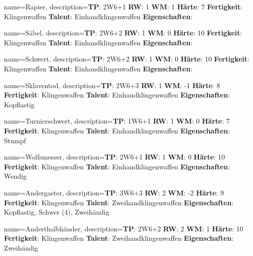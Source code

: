 {
    name={Rapier},
    description={\textbf{TP}: 2W6+1 \textbf{RW}: 1 \textbf{WM}: 1 \textbf{Härte}: 7        \textbf{Fertigkeit}: Klingenwaffen \textbf{Talent}: Einhandklingenwaffen \textbf{{Eigenschaften}}: }
}



{
    name={Säbel},
    description={\textbf{TP}: 2W6+2 \textbf{RW}: 1 \textbf{WM}: 0 \textbf{Härte}: 10        \textbf{Fertigkeit}: Klingenwaffen \textbf{Talent}: Einhandklingenwaffen \textbf{{Eigenschaften}}: }
}



{
    name={Schwert},
    description={\textbf{TP}: 2W6+2 \textbf{RW}: 1 \textbf{WM}: 0 \textbf{Härte}: 10        \textbf{Fertigkeit}: Klingenwaffen \textbf{Talent}: Einhandklingenwaffen \textbf{{Eigenschaften}}: }
}



{
    name={Sklaventod},
    description={\textbf{TP}: 2W6+3 \textbf{RW}: 1 \textbf{WM}: -1 \textbf{Härte}: 8        \textbf{Fertigkeit}: Klingenwaffen \textbf{Talent}: Einhandklingenwaffen \textbf{{Eigenschaften}}: Kopflastig}
}



{
    name={Turnierschwert},
    description={\textbf{TP}: 1W6+1 \textbf{RW}: 1 \textbf{WM}: 0 \textbf{Härte}: 7        \textbf{Fertigkeit}: Klingenwaffen \textbf{Talent}: Einhandklingenwaffen \textbf{{Eigenschaften}}: Stumpf}
}



{
    name={Wolfsmesser},
    description={\textbf{TP}: 2W6+1 \textbf{RW}: 1 \textbf{WM}: 0 \textbf{Härte}: 10        \textbf{Fertigkeit}: Klingenwaffen \textbf{Talent}: Einhandklingenwaffen \textbf{{Eigenschaften}}: Wendig}
}



{
    name={Andergaster},
    description={\textbf{TP}: 3W6+3 \textbf{RW}: 2 \textbf{WM}: -2 \textbf{Härte}: 9        \textbf{Fertigkeit}: Klingenwaffen \textbf{Talent}: Zweihandklingenwaffen \textbf{{Eigenschaften}}: Kopflastig, Schwer (4), Zweihändig}
}



{
    name={Anderthalbhänder},
    description={\textbf{TP}: 2W6+2 \textbf{RW}: 2 \textbf{WM}: 1 \textbf{Härte}: 10        \textbf{Fertigkeit}: Klingenwaffen \textbf{Talent}: Zweihandklingenwaffen \textbf{{Eigenschaften}}: Zweihändig}
}



